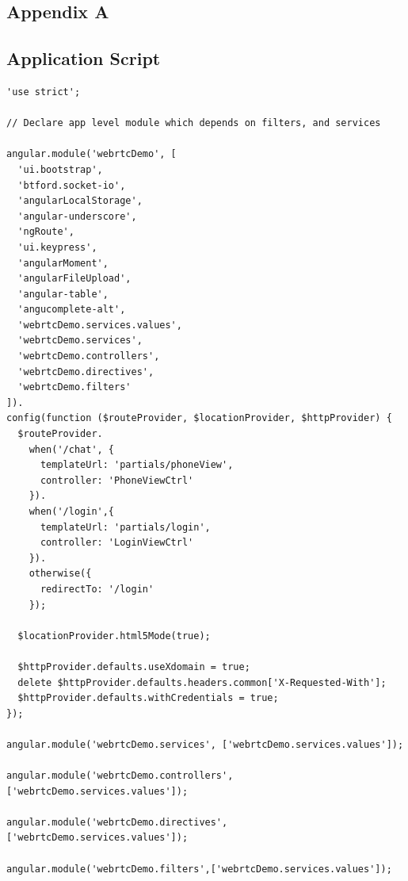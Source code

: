\appendix
{}
 \renewcommand{\chaptername}{\appendixname}
 
\begin{appendices}

\chapter{Appendix A}

\section{Application Script} 
\label{app:app_js}
\begin{lstlisting}[caption={app.js in application client},label={code:app_js}]
'use strict';

// Declare app level module which depends on filters, and services

angular.module('webrtcDemo', [
  'ui.bootstrap',
  'btford.socket-io',
  'angularLocalStorage',
  'angular-underscore',
  'ngRoute',
  'ui.keypress',
  'angularMoment',
  'angularFileUpload',
  'angular-table',
  'angucomplete-alt',
  'webrtcDemo.services.values',
  'webrtcDemo.services',
  'webrtcDemo.controllers',
  'webrtcDemo.directives',
  'webrtcDemo.filters'
]).
config(function ($routeProvider, $locationProvider, $httpProvider) {
  $routeProvider.
    when('/chat', {
      templateUrl: 'partials/phoneView',
      controller: 'PhoneViewCtrl'
    }).
    when('/login',{
      templateUrl: 'partials/login',
      controller: 'LoginViewCtrl'
    }).
    otherwise({
      redirectTo: '/login'
    });

  $locationProvider.html5Mode(true);

  $httpProvider.defaults.useXdomain = true;
  delete $httpProvider.defaults.headers.common['X-Requested-With'];
  $httpProvider.defaults.withCredentials = true;
});

angular.module('webrtcDemo.services', ['webrtcDemo.services.values']);

angular.module('webrtcDemo.controllers',['webrtcDemo.services.values']);

angular.module('webrtcDemo.directives',['webrtcDemo.services.values']);

angular.module('webrtcDemo.filters',['webrtcDemo.services.values']);
\end{lstlisting}


\end{appendices}
